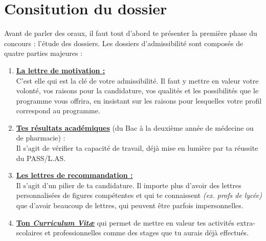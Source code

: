 \section{Consitution du dossier}


Avant de parler des oraux, il faut tout d’abord te présenter la première phase du concours : l’étude des dossiers. Les dossiers d’admissibilité sont composés de quatre parties majeures :

\begin{enumerate}[label=\arabic*.]
\item \uline{\textbf{La lettre de motivation :}}\\ 
C’est elle qui est la clé de votre admissibilité. Il faut y mettre en valeur votre volonté, vos raisons pour la candidature, vos qualités et les possibilités que le programme vous offrira, en insistant sur les raisons pour lesquelles votre profil correspond au programme.
\item \uline{\textbf{Tes résultats académiques}} (du Bac à la deuxième année de médecine ou de pharmacie) :\\
Il s’agit de vérifier ta capacité de travail, déjà mise en lumière par ta réussite du PASS/L.AS.
\item \uline{\textbf{Les lettres de recommandation :}}\\
Il s’agit d’un pilier de ta candidature. Il importe plus d’avoir des lettres personnalisées de figures compétentes et qui te connaissent \textit{(ex. profs de lycée)} que d’avoir beaucoup de lettres, qui peuvent être parfois impersonnelles.
\item \uline{\textbf{Ton \href{https://drive.google.com/file/d/1cVb_Z6DrBkKD3Q_1rMXHFVpm5KtDrTch/view?usp=sharing}{\textit{Curriculum Vit\ae}}}} qui permet de mettre en valeur tes activités extra-scolaires et professionnelles comme des stages que tu aurais déjà effectués.
\end{enumerate}

